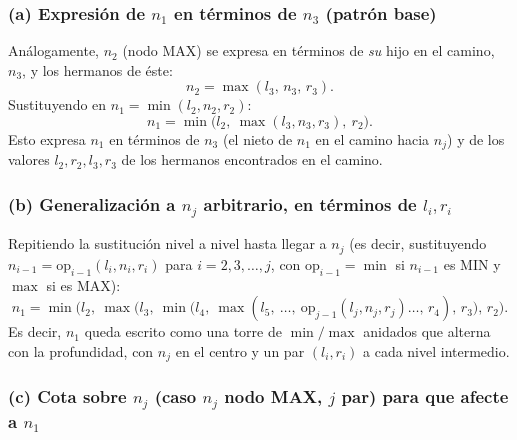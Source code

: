 \documentclass[11pt,onecolumn,letterpaper]{article}
\begin{document}
\subsubsection*{(a) Expresi\'on de $n_1$ en t\'erminos de $n_3$ (patr\'on base)}

An\'alogamente, $n_2$ (nodo MAX) se expresa en t\'erminos de \emph{su} hijo en el camino,
$n_3$, y los hermanos de \'este:
$$n_2 = \max(l_3,\, n_3,\, r_3).$$
Sustituyendo en $n_1=\min(l_2,n_2,r_2)$:
$$
n_1 = \min\big(l_2,\ \max(l_3, n_3, r_3),\ r_2\big).
$$
Esto expresa $n_1$ en t\'erminos de $n_3$ (el nieto de $n_1$ en el camino hacia $n_j$) y de
los valores $l_2,r_2,l_3,r_3$ de los hermanos encontrados en el camino.

\subsubsection*{(b) Generalizaci\'on a $n_j$ arbitrario, en t\'erminos de $l_i,r_i$}

Repitiendo la sustituci\'on nivel a nivel hasta llegar a $n_j$ (es decir, sustituyendo
$n_{i-1}=\text{op}_{i-1}(l_i,n_i,r_i)$ para $i=2,3,\dots,j$, con $\text{op}_{i-1}=\min$ si
$n_{i-1}$ es MIN y $\max$ si es MAX):
$$
n_1 = \min\Big(l_2,\ \max\big(l_3,\ \min(l_4,\ \max(l_5,\ \dots,\ \text{op}_{j-1}(l_j,n_j,r_j)\dots,\,r_4),\,r_3\big),\,r_2\Big).
$$
Es decir, $n_1$ queda escrito como una torre de $\min/\max$ anidados que alterna con la
profundidad, con $n_j$ en el centro y un par $(l_i,r_i)$ a cada nivel intermedio.

\subsubsection*{(c) Cota sobre $n_j$ (caso $n_j$ nodo MAX, $j$ par) para que afecte a $n_1$}
\end{document}
